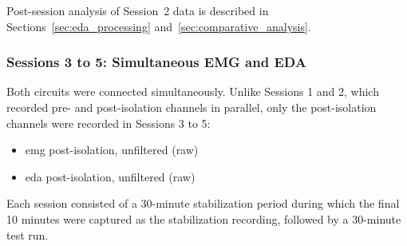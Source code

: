 Post-session analysis of Session~2 data is described in Sections~\ref{sec:eda_processing} and~\ref{sec:comparative_analysis}.

\subsubsection{Sessions 3 to 5: Simultaneous EMG and EDA} \label{sec:session3-5}
Both circuits were connected simultaneously. Unlike Sessions 1 and 2, which recorded pre- and post-isolation channels in parallel, only the post-isolation channels were recorded in Sessions 3 to 5:
\begin{itemize}
    \item \gls{emg} post-isolation, unfiltered (raw)
    \item \gls{eda} post-isolation, unfiltered (raw)
\end{itemize}
Each session consisted of a 30-minute stabilization period during which the final 10 minutes were captured as the stabilization recording, followed by a 30-minute test run.

